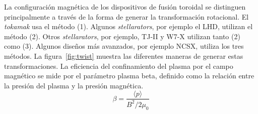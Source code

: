 \par
La configuración magnética de los dispositivos de fusión toroidal se distinguen principalmente
a través de la forma de generar la transformación rotacional. El \textit{tokamak}
usa el método (1). Algunos \textit{stellarators}, por ejemplo el LHD, utilizan el método (2). Otros \textit{stellarators}, por 
ejemplo, TJ-II y W7-X utilizan tanto (2) como (3). Algunos diseños más avanzados, por ejemplo
NCSX, utiliza los tres métodos. La figura~\ref{fig:twist} muestra las diferentes maneras de generar estas transformaciones.
La eficiencia del confinamiento del plasma por el campo magnético se mide por
el parámetro plasma beta, definido como la relación entre la presión del plasma y la presión magnética.
\begin{equation}\label{eq:beta}
    \beta=\frac{\langle p\rangle}{B^2/2\mu_0}
\end{equation}